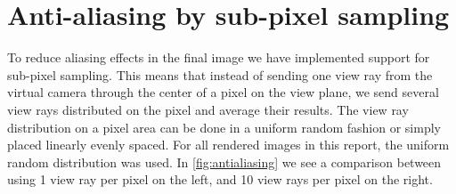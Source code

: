 \documentclass[]{report}   %
\begin{document}
\section{Anti-aliasing by sub-pixel sampling}
To reduce aliasing effects in the final image we have implemented support for sub-pixel sampling.
This means that instead of sending one view ray from the virtual camera through the center of a pixel on the view plane, we send several view rays distributed on the pixel and average their results.
The view ray distribution on a pixel area can be done in a uniform random fashion or simply placed linearly evenly spaced.
For all rendered images in this report, the uniform random distribution was used.
In  \autoref{fig:antialiasing} we see a comparison between using 1 view ray per pixel on the left, and 10 view rays per pixel on the right.
\end{document}
